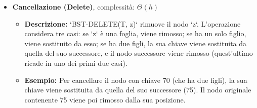 \begin{itemize}
    \item \textbf{Cancellazione (Delete)}, complessità: $\Theta(h)$
    \begin{itemize}
        \item \textbf{Descrizione:} `BST-DELETE(T, z)` rimuove il nodo `z`. L'operazione considera tre casi: se `z` è una foglia, viene rimosso; se ha un solo figlio, viene sostituito da esso; se ha due figli, la sua chiave viene sostituita da quella del suo successore, e il nodo successore viene rimosso (quest'ultimo ricade in uno dei primi due casi).
        \item \textbf{Esempio:} Per cancellare il nodo con chiave 70 (che ha due figli), la sua chiave viene sostituita da quella del suo successore (75). Il nodo originale contenente 75 viene poi rimosso dalla sua posizione.
    \end{itemize}
\end{itemize}

